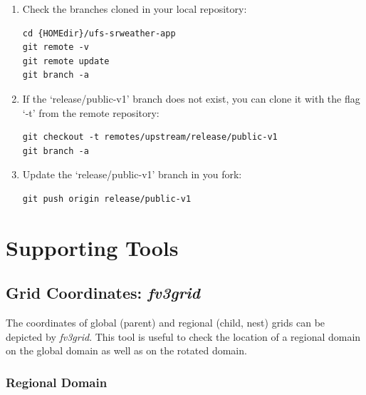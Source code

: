 \documentclass[11pt,fleqn]{report}              %
\begin{document}
\begin{enumerate}
\item Check the branches cloned in your local repository:
\lstset{language=bash}   
\begin{lstlisting}[frame=trBL]
cd {HOMEdir}/ufs-srweather-app
git remote -v
git remote update
git branch -a
\end{lstlisting}

\item If the `release/public-v1' branch does not exist, you can clone it with the flag `-t' from the remote repository:
\lstset{language=bash}   
\begin{lstlisting}[frame=trBL]
git checkout -t remotes/upstream/release/public-v1
git branch -a
\end{lstlisting}

\item Update the `release/public-v1' branch in you fork:
\lstset{language=bash}   
\begin{lstlisting}[frame=trBL]
git push origin release/public-v1
\end{lstlisting}

\end{enumerate}




\chapter{Supporting Tools}               
\label{chpt:sar_post}


\section{Grid Coordinates: {\it fv3grid}}                 
\label{sec:post_grid}

The coordinates of global (parent) and regional (child, nest) grids can be depicted by {\it fv3grid}. This tool is useful to check the location of a regional domain on the global domain as well as on the rotated domain. \\

\subsection{Regional Domain}
\label{subsec:fv3grid_regional}
\end{document}
